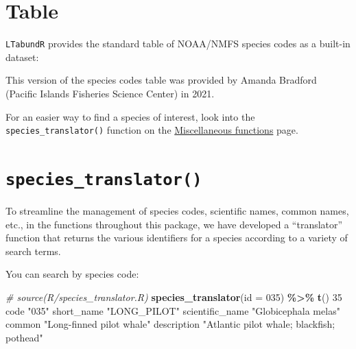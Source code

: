 \documentclass[
]{book}
\newenvironment{Shaded}{\begin{snugshade}}{\end{snugshade}}
\newcommand{\AttributeTok}[1]{\textcolor[rgb]{0.13,0.29,0.53}{#1}}
\newcommand{\CommentTok}[1]{\textcolor[rgb]{0.56,0.35,0.01}{\textit{#1}}}
\newcommand{\DecValTok}[1]{\textcolor[rgb]{0.00,0.00,0.81}{#1}}
\newcommand{\FunctionTok}[1]{\textcolor[rgb]{0.13,0.29,0.53}{\textbf{#1}}}
\newcommand{\NormalTok}[1]{#1}
\newcommand{\SpecialCharTok}[1]{\textcolor[rgb]{0.81,0.36,0.00}{\textbf{#1}}}
\newcommand{\StringTok}[1]{\textcolor[rgb]{0.31,0.60,0.02}{#1}}
\begin{document}
\hypertarget{table}{%
\section*{Table}\label{table}}

\texttt{LTabundR} provides the standard table of NOAA/NMFS species codes as a built-in dataset:

This version of the species codes table was provided by Amanda Bradford (Pacific Islands Fisheries Science Center) in 2021.

For an easier way to find a species of interest, look into the \texttt{species\_translator()} function on the \protect\hyperlink{misc_functions}{Miscellaneous functions} page.

\hypertarget{species_translator}{%
\section*{\texorpdfstring{\texttt{species\_translator()}}{species\_translator()}}\label{species_translator}}

To streamline the management of species codes, scientific names, common names, etc., in the functions throughout this package, we have developed a ``translator'' function that returns the various identifiers for a species according to a variety of search terms.

You can search by species code:

\begin{Shaded}
\begin{Highlighting}[]
\CommentTok{\# source(\textquotesingle{}R/species\_translator.R\textasciigrave{})}
\FunctionTok{species\_translator}\NormalTok{(}\AttributeTok{id =} \StringTok{\textquotesingle{}035\textquotesingle{}}\NormalTok{) }\SpecialCharTok{\%\textgreater{}\%} \FunctionTok{t}\NormalTok{()}
                \DecValTok{35}                                        
\NormalTok{code            }\StringTok{"035"}                                     
\NormalTok{short\_name      }\StringTok{"LONG\_PILOT"}                              
\NormalTok{scientific\_name }\StringTok{"Globicephala melas"}                      
\NormalTok{common          }\StringTok{"Long{-}finned pilot whale"}                 
\NormalTok{description     }\StringTok{"Atlantic pilot whale; blackfish; pothead"}
\end{Highlighting}
\end{Shaded}
\end{document}
